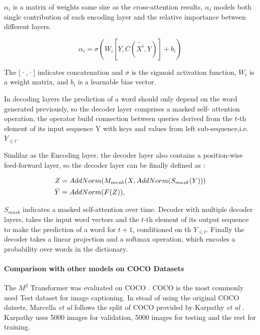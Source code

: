 \documentclass[
]{krantz}
\begin{document}
\(\alpha_i\) is a matrix of weights same size as the cross-attention results, \(\alpha_i\) models both single contribution of each encoding layer and the relative importance between different layers.\citep{cornia2020m2}

\begin{equation}
\alpha_i = \sigma(W_i [Y,C(\tilde{X^i}, Y)]+ b_i)
\end{equation}

The {[}·,·{]} indicates concatenation and \(\sigma\) is the sigmoid activation function, \(W_i\) is a weight matrix, and \(b_i\) is a learnable bias vector.\citep{cornia2020m2}

In decoding layers the prediction of a word should only depend on the word generated previously, so the decoder layer comprises a masked self- attention operation, the operator build connection between queries derived from the \(t\)-th element of its input sequence Y with keys and values from left sub-sequence,i.e.~\(Y_{≤t}\).

Simlilar as the Encoding layer, the decoder layer also contains a position-wise feed-forward layer, so the decoder layer can be finally defined as \citep{cornia2020m2}:

\begin{align}
Z &= AddNorm(M_{mesh}(X,AddNorm(S_{mask}(Y ))) \notag \\
\tilde{Y} &= AddNorm(F(Z)),
\end{align}

\(S_{mask}\) indicates a masked self-attention over time.\citep{cornia2020m2}
Decoder with multiple decoder layers, takes the input word vectors and the \(t\)-th element of its output sequence to make the prediction of a word for \(t + 1\), conditioned on th \(Y_{≤t}\). Finally the decoder takes a linear projection and a softmax operation, which encodes a probability over words in the dictionary.\citep{cornia2020m2}

\hypertarget{comparison-with-other-models-on-coco-datasets}{%
\paragraph{Comparison with other models on COCO Datasets}\label{comparison-with-other-models-on-coco-datasets}}

The \(M^2\) Transformer was evaluated on COCO \citep{mccoco}. COCO is the most commonly used Test dataset for image captioning. In stead of using the original COCO datsets, Marcella \emph{et al}\citep{cornia2020m2} follows the split of COCO provided by Karpathy \emph{et al} \citep{karpthy1}. Karpathy uses 5000 images for validation, 5000 images for testing and the rest for training.
\end{document}
